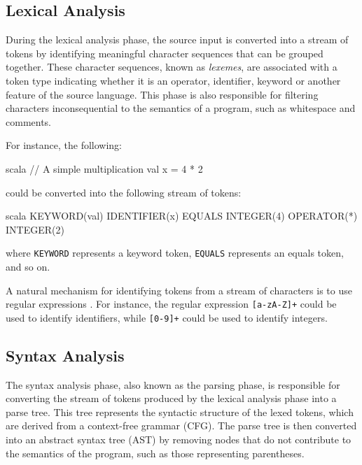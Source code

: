 \subsection{Lexical Analysis}

During the lexical analysis phase, the source input is converted into a stream of tokens by
identifying meaningful character sequences that can be grouped together. These character sequences,
known as \emph{lexemes}, are associated with a token type indicating whether it is an operator,
identifier, keyword or another feature of the source language. This phase is also responsible for
filtering characters inconsequential to the semantics of a program, such as whitespace and comments.

For instance, the following:

\begin{code}{scala}
    // A simple multiplication
    val x = 4 * 2
\end{code}

\noindent could be converted into the following stream of tokens:

\begin{code}{scala}
    KEYWORD(val) IDENTIFIER(x) EQUALS INTEGER(4) OPERATOR(*) INTEGER(2)
\end{code}

\noindent where \texttt{KEYWORD} represents a keyword token,
\texttt{EQUALS} represents an equals token, and so on.

A natural mechanism for identifying tokens from a stream of characters is to use regular expressions
\autocite{aho2007compilers}. For instance, the regular expression \texttt{[a-zA-Z]+}
could be used to identify identifiers, while \texttt{[0-9]+} could be used to identify
integers.

\subsection{Syntax Analysis}

The syntax analysis phase, also known as the parsing phase, is responsible for converting the stream
of tokens produced by the lexical analysis phase into a parse tree. This tree represents the
syntactic structure of the lexed tokens, which are derived from a context-free grammar (CFG).
The parse tree is then converted into an abstract syntax tree (AST) by removing nodes that do not
contribute to the semantics of the program, such as those representing parentheses.

